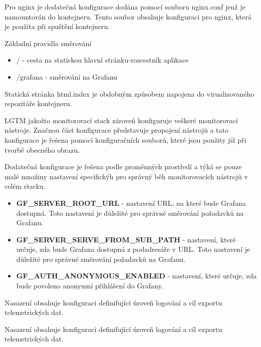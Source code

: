 


Pro nginx je dodatečná konfigurace dodána pomocí souboru nginx.conf jenž je namountován do kontejneru. Tento soubor obsahuje konfiguraci pro nginx, která je použita při spuštění kontejneru.

Základní pravidla směrování

\begin{itemize}
    \item / - cesta na statickou hlavní stránku-rozcestník aplikace
    \item /grafana - směrování na Grafanu
\end{itemize}

Statická stránka html.index je obdobným způsobem napojena do virualizovaného repozitáře kontejneru.


LGTM jakožto monitorovací stack zároveň konfiguruje veškeré monitorovací nástroje. Značnou část konfigurace představuje propojení nástrojů a tato konfigurace je řešena pomocí konfiguračních souborů, které jsou použity již při tvorbě obecného obrazu.

Dodatečná konfigurace je řešena podle proměnných prostředí a týká se pouze malé množiny nastavení specifickýh pro správný běh monitorovacích nástrojů v celém stacku.

\begin{itemize}
    \item \textbf{GF\_SERVER\_ROOT\_URL} - nastavení URL, na které bude Grafana dostupná. Toto nastavení je důležité pro správné směrování požadavků na Grafanu.
    \item \textbf{GF\_SERVER\_SERVE\_FROM\_SUB\_PATH} - nastavení, které určuje, zda bude Grafana dostupná z podadresáře v URL. Toto nastavení je důležité pro správné směrování požadavků na Grafanu.
    \item \textbf{GF\_AUTH\_ANONYMOUS\_ENABLED} - nastavení, které určuje, zda bude povoleno anonymní přihlášení do Grafany.
\end{itemize}



Nasazení obsahuje konfiguraci definifující úroveň logování a cíl exportu telemetrických dat.


Nasazení obsahuje konfiguraci definifující úroveň logování a cíl exportu telemetrických dat.

